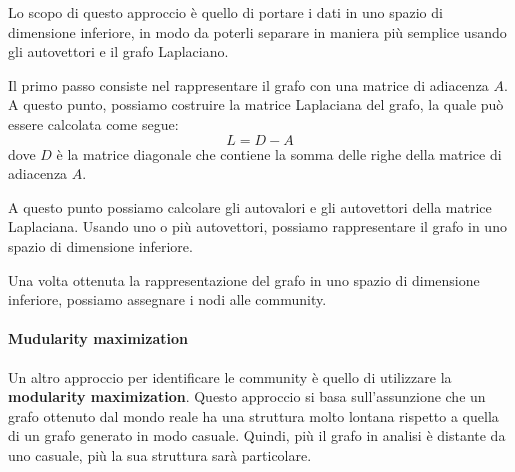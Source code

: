 Lo scopo di questo approccio è quello di portare i dati in uno spazio di dimensione
inferiore, in modo da poterli separare in maniera più semplice usando gli autovettori
e il grafo Laplaciano.

Il primo passo consiste nel rappresentare il grafo con una matrice di adiacenza
$A$. A questo punto, possiamo costruire la matrice Laplaciana del grafo, la quale
può essere calcolata come segue:
\begin{equation}
    L = D - A
\end{equation}
dove $D$ è la matrice diagonale che contiene la somma delle righe della matrice
di adiacenza $A$.

A questo punto possiamo calcolare gli autovalori e gli autovettori della matrice
Laplaciana. Usando uno o più autovettori, possiamo rappresentare il grafo in uno
spazio di dimensione inferiore.

Una volta ottenuta la rappresentazione del grafo in uno spazio di dimensione
inferiore, possiamo assegnare i nodi alle community.
\paragraph{Mudularity maximization}
Un altro approccio per identificare le community è quello di utilizzare la
\textbf{modularity maximization}. Questo approccio si basa sull'assunzione che
un grafo ottenuto dal mondo reale ha una struttura molto lontana rispetto a
quella di un grafo generato in modo casuale. Quindi, più il grafo in analisi è
distante da uno casuale, più la sua struttura sarà particolare.

